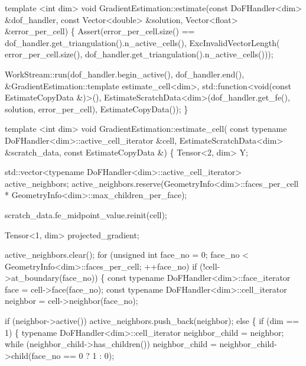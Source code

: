 \begin{DoxyCodeInclude}
\textcolor{keyword}{template} <\textcolor{keywordtype}{int} dim>
\textcolor{keywordtype}{void} GradientEstimation::estimate(\textcolor{keyword}{const} DoFHandler<dim> &dof\_handler,
                                  \textcolor{keyword}{const} Vector<double> &solution,
                                  Vector<float> &error\_per\_cell)
\{
    Assert(error\_per\_cell.size() ==
               dof\_handler.get\_triangulation().n\_active\_cells(),
           ExcInvalidVectorLength(
               error\_per\_cell.size(),
               dof\_handler.get\_triangulation().n\_active\_cells()));

    WorkStream::run(dof\_handler.begin\_active(), dof\_handler.end(),
                    &GradientEstimation::template estimate\_cell<dim>,
                    std::function<void(const EstimateCopyData &)>(),
                    EstimateScratchData<dim>(dof\_handler.get\_fe(), solution,
                                             error\_per\_cell),
                    EstimateCopyData());
\}


\textcolor{keyword}{template} <\textcolor{keywordtype}{int} dim>
\textcolor{keywordtype}{void} GradientEstimation::estimate\_cell(
    \textcolor{keyword}{const} \textcolor{keyword}{typename} DoFHandler<dim>::active\_cell\_iterator &cell,
    EstimateScratchData<dim> &scratch\_data, \textcolor{keyword}{const} EstimateCopyData &)
\{
    Tensor<2, dim> Y;


    std::vector<typename DoFHandler<dim>::active\_cell\_iterator>
        active\_neighbors;
    active\_neighbors.reserve(GeometryInfo<dim>::faces\_per\_cell *
                             GeometryInfo<dim>::max\_children\_per\_face);

    scratch\_data.fe\_midpoint\_value.reinit(cell);

    Tensor<1, dim> projected\_gradient;


    active\_neighbors.clear();
    \textcolor{keywordflow}{for} (\textcolor{keywordtype}{unsigned} \textcolor{keywordtype}{int} face\_no = 0; face\_no < GeometryInfo<dim>::faces\_per\_cell;
         ++face\_no)
        \textcolor{keywordflow}{if} (!cell->at\_boundary(face\_no)) \{
            \textcolor{keyword}{const} \textcolor{keyword}{typename} DoFHandler<dim>::face\_iterator face =
                cell->face(face\_no);
            \textcolor{keyword}{const} \textcolor{keyword}{typename} DoFHandler<dim>::cell\_iterator neighbor =
                cell->neighbor(face\_no);

            \textcolor{keywordflow}{if} (neighbor->active())
                active\_neighbors.push\_back(neighbor);
            \textcolor{keywordflow}{else} \{
                \textcolor{keywordflow}{if} (dim == 1) \{
                    \textcolor{keyword}{typename} DoFHandler<dim>::cell\_iterator neighbor\_child =
                        neighbor;
                    \textcolor{keywordflow}{while} (neighbor\_child->has\_children())
                        neighbor\_child =
                            neighbor\_child->child(face\_no == 0 ? 1 : 0);


\end{DoxyCodeInclude}
